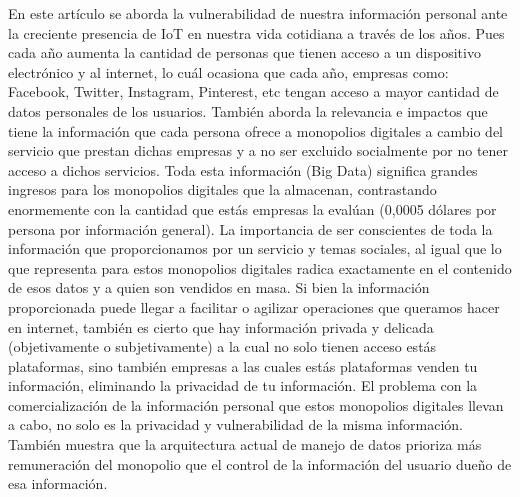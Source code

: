 
En este artículo se aborda la vulnerabilidad de nuestra información personal ante la creciente presencia de IoT en nuestra vida cotidiana a través de los años. Pues cada año aumenta la cantidad de personas que tienen acceso a un dispositivo electrónico y al internet, lo cuál ocasiona que cada año, empresas como: Facebook, Twitter, Instagram, Pinterest, etc tengan acceso a mayor cantidad de datos personales de los usuarios. También aborda la relevancia e impactos que tiene la información que cada persona ofrece a monopolios digitales a cambio del servicio que prestan dichas empresas y a no ser excluido socialmente por no tener acceso a dichos servicios. Toda esta información (Big Data) significa grandes ingresos para los monopolios digitales que la almacenan, contrastando enormemente con la cantidad que estás empresas la evalúan (0,0005 dólares por persona por información general). 
La importancia de ser conscientes de toda la información que proporcionamos por un servicio y temas sociales, al igual que lo que representa para estos monopolios digitales radica exactamente en el contenido de esos datos y a quien son vendidos en masa. Si bien la información proporcionada puede llegar a facilitar o agilizar operaciones que queramos hacer en internet, también es cierto que hay información privada y delicada (objetivamente o subjetivamente) a la cual no solo tienen acceso estás plataformas, sino también empresas a las cuales estás plataformas venden tu información, eliminando la privacidad de tu información. 
El problema con la comercialización de la información personal que estos monopolios digitales llevan a cabo, no solo es la privacidad y vulnerabilidad de la misma información. También muestra que la arquitectura actual de manejo de datos prioriza más remuneración del monopolio que el control de la información del usuario dueño de esa información.


